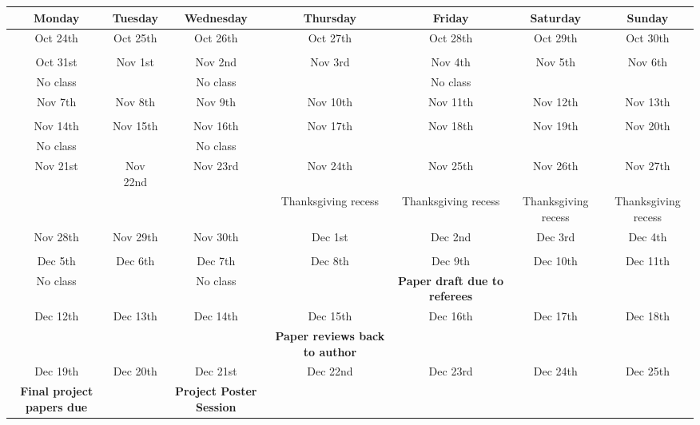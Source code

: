 \documentclass[10pt]{article}
\begin{document}
\begin{center}
	\begin{adjustbox}{width=1\textwidth}
	\def\arraystretch{1.5}
	\begin{tabular}{c |c |c |c | c | c | c}
		\hline
		Monday & Tuesday & Wednesday & Thursday & Friday & Saturday & Sunday \\
		\hline \hline
		Oct 24th & Oct 25th & Oct 26th & Oct 27th & Oct 28th & Oct 29th & Oct 30th \\ 
		 &  &  &  &  &  &  \\ \hline
		Oct 31st & Nov 1st & Nov 2nd & Nov 3rd & Nov 4th & Nov 5th & Nov 6th \\
		No class &  & No class &  & No class &  &  \\ \hline
		Nov 7th & Nov 8th & Nov 9th & Nov 10th & Nov 11th & Nov 12th & Nov 13th \\
		 &  &  &  &  &  &  \\ \hline
		Nov 14th & Nov 15th & Nov 16th & Nov 17th & Nov 18th & Nov 19th & Nov 20th \\ 
		No class &  & No class &  &  &  &  \\ \hline
		Nov 21st & Nov 22nd & Nov 23rd & Nov 24th & Nov 25th & Nov 26th & Nov 27th \\ 
		 &  &  & Thanksgiving recess & Thanksgiving recess & Thanksgiving recess & Thanksgiving recess \\ \hline
		Nov 28th & Nov 29th & Nov 30th & Dec 1st & Dec 2nd & Dec 3rd & Dec 4th \\ 
		 &  &  &  &  &  &  \\ \hline
		Dec 5th & Dec 6th & Dec 7th & Dec 8th & Dec 9th & Dec 10th & Dec 11th \\ 
		No class &  & No class&  & \textbf{Paper draft due to referees} &  &  \\ \hline
		Dec 12th & Dec 13th & Dec 14th & Dec 15th & Dec 16th & Dec 17th & Dec 18th \\ 
		 &  &  & \textbf{Paper reviews back to author} &  &  &  \\ \hline
		Dec 19th & Dec 20th & Dec 21st & Dec 22nd & Dec 23rd & Dec 24th & Dec 25th \\
		\textbf{Final project papers due} &  & \textbf{Project Poster Session} &  &  &  & \\ \hline
	\end{tabular}
	
	\end{adjustbox}
\end{center}
\end{document}
